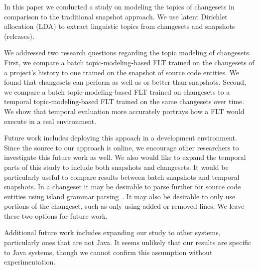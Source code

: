 
In this paper we conducted a study on modeling the topics of changesets in comparison to the traditional snapshot approach.
We use latent Dirichlet allocation (LDA) to extract linguistic topics from
changesets and snapshots (releases).

We addressed two research questions regarding the topic modeling of changesets.
First, we compare a batch topic-modeling-based FLT trained on the changesets
of a project's history to one trained on the snapshot of source code entities.
We found that changesets can perform as well as or better than snapshots.
Second, we compare a batch topic-modeling-based FLT trained on changesets
to a temporal topic-modeling-based FLT trained on the same changesets over time.
We show that temporal evaluation more accurately portrays how a FLT would execute in a real environment.



Future work includes deploying this appoach in a development environment.
Since the source to our approach is online, we encourage other researchers
to investigate this future work as well.
We also would like to expand the temporal parts of this study to include both snapshots and changesets.
It would be particularly useful to compare results between batch snapshots and temporal snapshots.
In a changeset it may be desirable to parse further for source code entities using island grammar parsing~\cite{Moonen:2001}.
It may also be desirable to only use portions of the changeset, such as only using added or removed lines.
We leave these two options for future work.

Additional future work includes expanding our study to other systems,
particularly ones that are not Java.
It seems unlikely that our results are specific to Java systems,
though we cannot confirm this assumption without experimentation.

